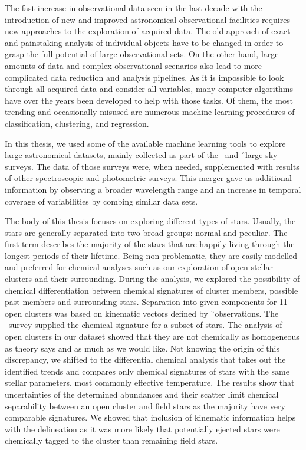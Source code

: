 The fast increase in observational data seen in the last decade with the introduction of new and improved astronomical observational facilities requires new approaches to the exploration of acquired data. The old approach of exact and painstaking analysis of individual objects have to be changed in order to grasp the full potential of large observational sets. On the other hand, large amounts of data and complex observational scenarios also lead to more complicated data reduction and analysis pipelines. As it is impossible to look through all acquired data and consider all variables, many computer algorithms have over the years been developed to help with those tasks. Of them, the most trending and occasionally misused are numerous machine learning procedures of classification, clustering, and regression.

In this thesis, we used some of the available machine learning tools to explore large astronomical datasets, mainly collected as part of the \Gh\ and \G\ large sky surveys. The data of those surveys were, when needed, supplemented with results of other spectroscopic and photometric surveys. This merger gave us additional information by observing a broader wavelength range and an increase in temporal coverage of variabilities by combing similar data sets.

The body of this thesis focuses on exploring different types of stars. Usually, the stars are generally separated into two broad groups: normal and peculiar. The first term describes the majority of the stars that are happily living through the longest periods of their lifetime. Being non-problematic, they are easily modelled and preferred for chemical analyses such as our exploration of open stellar clusters and their surrounding. During the analysis, we explored the possibility of chemical differentiation between chemical signatures of cluster members, possible past members and surrounding stars. Separation into given components for 11 open clusters was based on kinematic vectors defined by \G\ observations. The \Gh\ survey supplied the chemical signature for a subset of stars. The analysis of open clusters in our dataset showed that they are not chemically as homogeneous as theory says and as much as we would like. Not knowing the origin of this discrepancy, we shifted to the differential chemical analysis that takes out the identified trends and compares only chemical signatures of stars with the same stellar parameters, most commonly effective temperature. The results show that uncertainties of the determined abundances and their scatter limit chemical separability between an open cluster and field stars as the majority have very comparable signatures. We showed that inclusion of kinematic information helps with the delineation as it was more likely that potentially ejected stars were chemically tagged to the cluster than remaining field stars.

